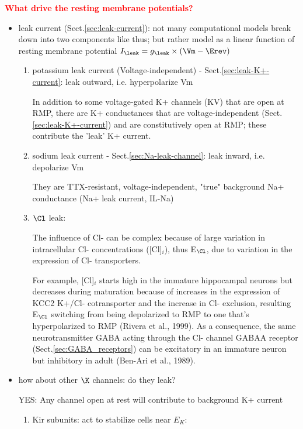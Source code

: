 \textcolor{red}{\bf What drive the resting membrane potentials?}
\begin{itemize}
  
  \item leak current (Sect.\ref{sec:leak-current}): not many computational
  models break down into two components like thus; but rather model as a linear
  function of resting membrane potential $I_\leak = g_\leak \times (\Vm -
  \Erev)$
  \begin{enumerate}
    \item  potassium leak current (Voltage-independent) -
    Sect.\ref{sec:leak-K+-current}:
    leak outward, i.e. hyperpolarize Vm
    
    In addition to some voltage-gated K+ channels (KV) that are open at RMP,
    there are K+ conductances that are voltage-independent
    (Sect.\ref{sec:leak-K+-current}) and are constitutively open at RMP; these
    contribute the 'leak' K+ current.
       
     \item sodium leak current - Sect.\ref{sec:Na-leak-channel}: leak inward,
     i.e. depolarize Vm
    
  They are TTX-resistant, voltage-independent, "true" background Na+ conductance
  (Na+ leak current, IL-Na) 

    \item $\Cl$ leak:
    
    The influence of Cl- can be complex because of large variation in
    intracellular Cl- concentrations ([Cl]$_i$), thus E$_\Cl$, due to variation
    in the expression of Cl- transporters.
    
    For example, [Cl]$_i$ starts high in the immature hippocampal neurons but
    decreases during maturation because of increases in the expression of KCC2
    K+/Cl- cotransporter and the increase in Cl- exclusion, resulting E$_\Cl$
    switching from being depolarized to RMP to one that's hyperpolarized to RMP
    (Rivera et al., 1999). As a consequence, the same neurotransmitter GABA
    acting through the Cl- channel GABAA receptor
    (Sect.\ref{sec:GABA_receptors}) can be excitatory in an immature neuron but
    inhibitory in adult (Ben-Ari et al., 1989).
       
  \end{enumerate}
  
  \item how about other $\K$ channels: do they leak? 
  
YES: Any channel open at rest will contribute to
background K+ current
\begin{enumerate}
  \item Kir subunits: act to stabilize cells near $E_K$: 
  

\end{enumerate}
\end{itemize}
